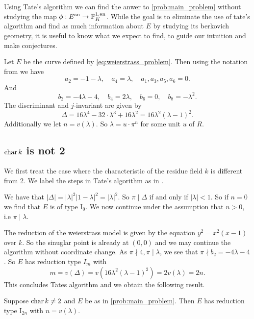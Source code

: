 Using Tate's algorithm we can find the anwer to \cref{prob:main_problem} without studying the map $\phi: E{}^{\text{an}} \to \mathbb{P}^{1, \text{an}}_K$. 
While the goal is to eliminate the use of tate's algorithm and find as much information about $E$ by studying its berkovich geometry, 
it is useful to know what we expect to find, to guide our intuition and make conjectures. 

Let $E$ be the curve defined by \eqref{eq:weierstrass_problem}. 
Then using the notation from \cite[p.364]{silvermanAdvancedTopicsArithmetic1994} we have \[
a_2 = -1 - \lambda,\quad a_4 = \lambda, \quad a_1, a_3, a_5, a_6 = 0
.\] 
And \[
b_2 = -4 \lambda - 4, \quad b_4 = 2\lambda, \quad b_6 = 0, \quad b_8 = -\lambda ^2
.\] 
The discriminant and $j$-invariant are given by \[
	\Delta = 16\lambda^4 - 32\cdot \lambda^3 + 16\lambda^2 = 16 \lambda^2(\lambda - 1)^2
.\] 
Additionally we let $n = v(\lambda)$.
So $\lambda = u \cdot \pi^{n}$ for some unit $u$ of $R$.

\subsection{$\operatorname{char} k$ is not 2} \label{sec:char_k_is_not_2}
We first treat the case where the characteristic of the residue field $k$ is different from 2. 
We label the steps in Tate's algorithm as in \cite[sec.\ IV.9]{silvermanAdvancedTopicsArithmetic1994}.

We have that $|\Delta| = |\lambda|^2 |1-\lambda|^2 = |\lambda|^2 $. 
So $\pi \mid \Delta$ if and only if  $|\lambda| < 1$. 
So if  $n = 0$ we find that $E$ is of type $\mathrm I_0$. 
We now continue under the assumption that $n > 0$, i.e $\pi \mid \lambda$. 

The reduction of the weierstrass model is given by the equation $y^2 = x^2 (x - 1)$ over $k$. 
So the sinuglar point is already at $(0, 0)$ and we may continue the algorithm without coordinate change. 
As $\pi \nmid 4, \pi \mid \lambda$, we see that $\pi \nmid b_2 = -4\lambda - 4$. 
So $E$ has reduction type $I_m$ with \[
	m = v(\Delta) = v(16 \lambda^2 (\lambda - 1)^2)  = 2v(\lambda) = 2n
.\]
This concludes Tates algorithm and we obtain the following result. 

\begin{proposition}
	Suppose $\operatorname{char} k \ne 2$ and $E$ be as in \cref{prob:main_problem}. 
	Then $E$ has reduction type $\mathrm I_{2n}$ with $n = v(\lambda)$. 
\end{proposition}

